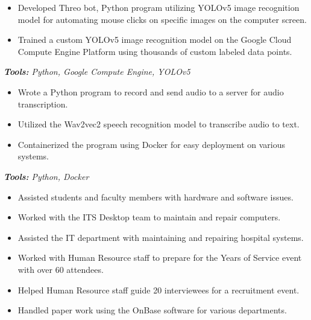 \documentclass[10pt,letter]{altacv}
\begin{document}
\divider

\begin{itemize}
  \item Developed Threo bot, Python program utilizing YOLOv5 image recognition model for automating mouse clicks on specific images on the computer screen.
  \item Trained a custom YOLOv5 image recognition model on the Google Cloud Compute Engine Platform using thousands of custom labeled data points.
\end{itemize}
\textit{\textbf{Tools:} Python, Google Compute Engine, YOLOv5}

\divider

\begin{itemize}
  \item Wrote a Python program to record and send audio to a server for audio transcription.
  \item Utilized the Wav2vec2 speech recognition model to transcribe audio to text.
  \item Containerized the program using Docker for easy deployment on various systems.
\end{itemize}
\textit{\textbf{Tools:} Python, Docker}

\medskip


\begin{itemize}
  \item Assisted students and faculty members with hardware and software issues.
  \item Worked with the ITS Desktop team to maintain and repair computers.
\end{itemize}

\divider

\begin{itemize}
  \item Assisted the IT department with maintaining and repairing hospital systems.
  \item Worked with Human Resource staff to prepare for the Years of Service event with over 60 attendees.
  \item Helped Human Resource staff guide 20 interviewees for a recruitment event.
  \item Handled paper work using the OnBase software for various departments.
\end{itemize}
\end{document}
